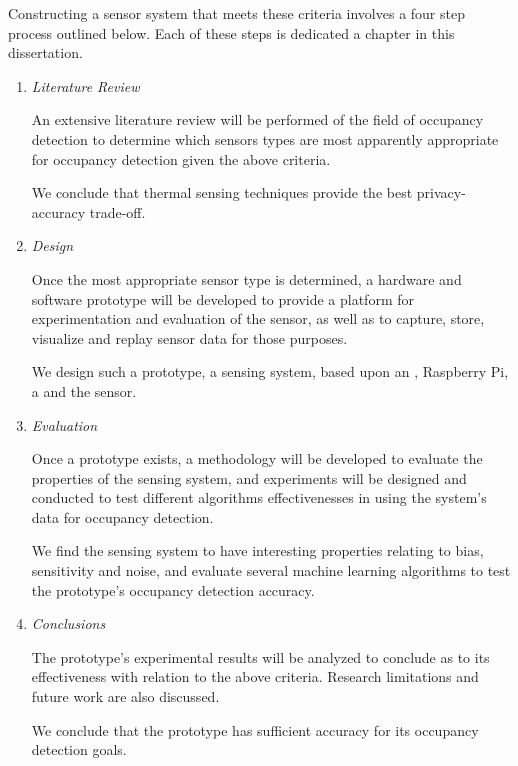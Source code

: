 \documentclass[../thesis/thesis.tex]{subfiles}
\begin{document}
Constructing a sensor system that meets these criteria involves a four step process outlined below. Each of these steps is dedicated a chapter in this dissertation.
\begin{enumerate}
\item \emph{Literature Review}

An extensive literature review will be performed of the field of occupancy detection to determine which sensors types are most apparently appropriate for occupancy detection given the above criteria.

We conclude that thermal sensing techniques provide the best privacy-accuracy trade-off.

\item \emph{Design}

Once the most appropriate sensor type is determined, a hardware and software prototype will be developed to provide a platform for experimentation and evaluation of the sensor, as well as to capture, store, visualize and replay sensor data for those purposes.

We design such a prototype, a sensing system, based upon an \ard, Raspberry Pi, a \pir and the \mlx sensor.

\item \emph{Evaluation}

Once a prototype exists, a methodology will be developed to evaluate the properties of the sensing system, and experiments will be designed and conducted to test different algorithms effectivenesses in using the system's data for occupancy detection.

We find the sensing system to have interesting properties relating to bias, sensitivity and noise, and evaluate several machine learning algorithms to test the prototype's occupancy detection accuracy.

\item \emph{Conclusions}

The prototype's experimental results will be analyzed to conclude as to its effectiveness with relation to the above criteria. Research limitations and future work are also discussed.

We conclude that the prototype has sufficient accuracy for its occupancy detection goals. %
\end{enumerate}

 
\end{document}
